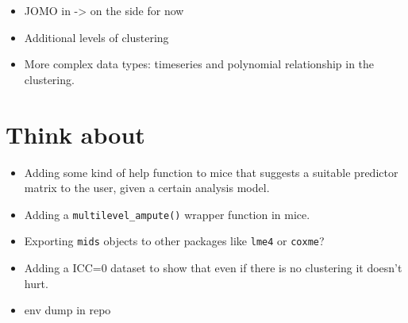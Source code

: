 \documentclass[
]{jss}
\begin{document}
\begin{itemize}
\item
  JOMO in  -\textgreater{} on the side for now
\item
  Additional levels of clustering
\item
  More complex data types: timeseries and polynomial relationship in the
  clustering.
\end{itemize}

\hypertarget{think-about}{%
\section{Think about}\label{think-about}}

\begin{itemize}
\item
  Adding some kind of help function to mice that suggests a suitable
  predictor matrix to the user, given a certain analysis model.
\item
  Adding a \texttt{multilevel\_ampute()} wrapper function in mice.
\item
  Exporting \texttt{mids} objects to other packages like \texttt{lme4}
  or \texttt{coxme}?
\item
  Adding a ICC=0 dataset to show that even if there is no clustering it
  doesn't hurt.
\item
  env dump in repo
\end{itemize}

\renewcommand\refname{References}

\end{document}
